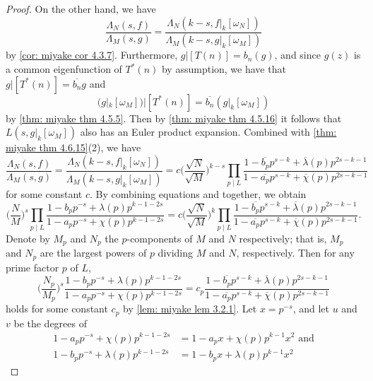 \documentclass[10pt,leqno,twoside]{article}
\theoremstyle{plain}
\theoremstyle{definition}
\numberwithin{equation}{section}
\numberwithin{lem}{section}
\begin{document}
\begin{proof}
    On the other hand, we have
    \[\frac{\varLambda_N(s,f)}{\varLambda_M(s,g)} = \frac{\varLambda_N(k-s,f|_k[\omega_N])}{\varLambda_M(k-s,g|_k[\omega_M])}\] by \cref{cor: miyake cor 4.3.7}. Furthermore, $g|[T(n)] = b_n(g)$, and since $g(z)$ is a common eigenfunction of $T^\ast(n)$ by assumption, we have that $g|[T^\ast(n)] = \overline{b_n}g$ and 
    \[(g|_k[\omega_M])|[T^\ast(n)] = \overline{b_n}(g|_k[\omega_M])\] by \cref{thm: miyake thm 4.5.5}. Then by \cref{thm: miyake thm 4.5.16} it follows that $L(s, g|_k[\omega_M])$ also has an Euler product expansion. Combined with \cref{thm: miyake thm 4.6.15}(2), we have 
    \begin{equation}\label{eqn: ratio shifted varLambdas}
        \frac{\varLambda_N(s,f)}{\varLambda_M(s,g)} = \frac{\varLambda_N(k-s,f|_k[\omega_N])}{\varLambda_M(k-s,g|_k[\omega_M])} = c\bigg(\frac{\sqrt{N}}{\sqrt{M}}\bigg)^{k-s}\prod_{p\mid L}\frac{1-\overline{b_p}p^{s-k} + \overline{\lambda}(p)p^{2s-k-1}}{1-\overline{a_p}p^{s-k} + \overline{\chi}(p)p^{2s-k-1}}
    \end{equation} for some constant $c$. By combining equations  and  together, we obtain
    \[\bigg(\frac{N}{M}\bigg)^s\prod_{p\mid L}\frac{1-b_pp^{-s} + \lambda(p)p^{k-1-2s}}{1-a_pp^{-s} + \chi(p)p^{k-1-2s}} = c\bigg(\frac{\sqrt{N}}{\sqrt{M}}\bigg)^k\prod_{p\mid L}\frac{1-\overline{b_p}p^{s-k} + \overline{\lambda}(p)p^{2s-k-1}}{1-\overline{a_p}p^{s-k} + \overline{\chi}(p)p^{2s-k-1}}.\]
    Denote by $M_p$ and $N_p$ the $p$-components of $M$ and $N$ respectively; that is, $M_p$ and $N_p$ are the largest powers of $p$ dividing $M$ and $N$, respectively. Then for any prime factor $p$ of $L$, 
    \begin{equation}\label{eqn: p-comps}
        \bigg(\frac{N_p}{M_p}\bigg)^s\frac{1-b_pp^{-s} + \lambda(p)p^{k-1-2s}}{1-a_pp^{-s} + \chi(p)p^{k-1-2s}} = c_p
        \frac{1-\overline{b_p}p^{s-k} + \overline{\lambda}(p)p^{2s-k-1}}{1-\overline{a_p}p^{s-k} + \overline{\chi}(p)p^{2s-k-1}}
    \end{equation} holds for some constant $c_p$ by \cref{lem: miyake lem 3.2.1}. Let $x=p^{-s}$, and let $u$ and $v$ be the degrees of
    \begin{align*}
        1-a_pp^{-s} + \chi(p)p^{k-1-2s} &= 1-a_px + \chi(p)p^{k-1}x^2 \text{ and}\\
        1-b_pp^{-s} + \lambda(p)p^{k-1-2s} &= 1-b_px + \lambda(p)p^{k-1}x^2

\end{align*}
\end{proof}
\end{document}
